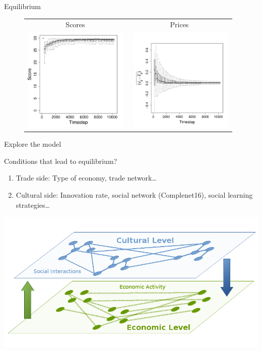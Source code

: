 \documentclass[12pt, notes=show]{beamer}
\begin{document}
\begin{frame}{Equilibrium}
    \begin{figure}[!h]
	\centering
	\begin{tabular}{ c c}
	    Scores & Prices \\
	    \includegraphics[width=5cm]{../20160329_CAA/images/ScoreEvolutionForTrade-G3N500.pdf}
	    & \
		\includegraphics[width=5cm]{../20160329_CAA/images/ClearingPriceDistanceEvolutionForTrade-G3N500.pdf}\\

	\end{tabular}
	\label{fig:scoreEvol}
    \end{figure}
\end{frame}

\begin{frame}{Explore the model}

    Conditions that lead to equilibrium?

     \vfill
    \begin{enumerate}
	\item Trade side: Type of economy, trade network\dots 
	\item Cultural side: Innovation rate, social network (Complenet16), social learning strategies\dots
    \end{enumerate}
    \begin{center}
	\includegraphics[width=.8\textwidth]{../201605_BSC2/images/interaction}	
    \end{center}
\end{frame}
\end{document}
